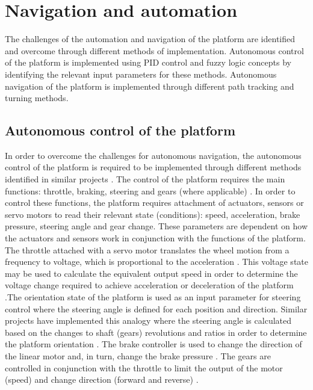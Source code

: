 \documentclass[main.tex]{subfiles}
\begin{document}
\section{Navigation and automation}
The challenges of the automation and navigation of the platform are identified and overcome through different methods of implementation. Autonomous control of the platform is implemented using PID control and fuzzy logic concepts by identifying the relevant input parameters for these methods. Autonomous navigation of the platform is implemented through different path tracking and turning methods.  

\subsection{Autonomous control of the platform}
In order to overcome the challenges for autonomous navigation, the autonomous control of the platform is required to be implemented through different methods identified in similar projects \parencite{zhao2012design,scheiner2011}. The control of the platform requires the main functions: throttle, braking, steering and gears (where applicable) \parencite{zhao2012design}. In order to control these functions, the platform requires attachment of actuators, sensors or servo motors to read their relevant state (conditions): speed, acceleration, brake pressure, steering angle and gear change. These parameters are dependent on how the actuators and sensors work in conjunction with the functions of the platform. The throttle attached with a servo motor translates the wheel motion from a frequency to voltage, which is proportional to the acceleration \parencite{zhao2012design,scheiner2011}. This voltage state may be used to calculate the equivalent output speed in order to determine the voltage change required to achieve acceleration or deceleration of the platform \parencite{scheiner2011}.The orientation state of the platform is used as an input parameter for steering control where the steering angle is defined for each position and direction. Similar projects have implemented this analogy where the steering angle is calculated based on the changes to shaft (gears) revolutions and ratios in order to determine the platform orientation \parencite{zhang2010study,zhao2012design}. The brake controller is used to change the direction of the linear motor and, in turn, change the brake pressure \parencite{zhao2012design}. The gears are controlled in conjunction with the throttle to limit the output of the motor (speed) and change direction (forward and reverse) \parencite{tran2007modelling}.
\end{document}
